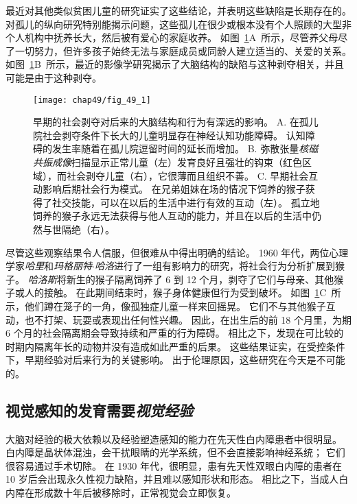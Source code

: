 最近对其他类似贫困儿童的研究证实了这些结论，并表明这些缺陷是长期存在的。
对孤儿的纵向研究特别能揭示问题，这些孤儿在很少或根本没有个人照顾的大型非个人机构中抚养长大，然后被有爱心的家庭收养。
如图~\ref{fig:49_1}A~所示，尽管养父母尽了一切努力，但许多孩子始终无法与家庭成员或同龄人建立适当的、关爱的关系。
如图~\ref{fig:49_1}B~所示，最近的影像学研究揭示了大脑结构的缺陷与这种剥夺相关，并且可能是由于这种剥夺。


\begin{figure}[htbp]
	\centering
	\texttt{[image: chap49/fig\_49\_1]}
	\caption{早期的社会剥夺对后来的大脑结构和行为有深远的影响。
		A. 在孤儿院社会剥夺条件下长大的儿童明显存在神经认知功能障碍。
		认知障碍的发生率随着在孤儿院逗留时间的延长而增加\cite{behen2008incidence}。
		B. 弥散张量\textit{核磁共振成像}扫描显示正常儿童（左）发育良好且强壮的钩束（红色区域），而社会剥夺儿童（右），它很薄而且组织不善\cite{eluvathingal2006abnormal}。
		C. 早期社会互动影响后期社会行为模式。
		在兄弟姐妹在场的情况下饲养的猴子获得了社交技能，可以在以后的生活中进行有效的互动（左）。
		孤立地饲养的猴子永远无法获得与他人互动的能力，并且在以后的生活中仍然与世隔绝（右）。}
	\label{fig:49_1}
\end{figure}


尽管这些观察结果令人信服，但很难从中得出明确的结论。
1960 年代，两位心理学家\textit{哈里}和\textit{玛格丽特$\cdot$哈洛}进行了一组有影响力的研究，将社会行为分析扩展到猴子。
\textit{哈洛斯}将新生的猴子隔离饲养了 6 到 12 个月，剥夺了它们与母亲、其他猴子或人的接触。
在此期间结束时，猴子身体健康但行为受到破坏。
如图~\ref{fig:49_1}C~所示，他们蹲在笼子的一角，像孤独症儿童一样来回摇晃。
它们不与其他猴子互动，也不打架、玩耍或表现出任何性兴趣。
因此，在出生后的前 18 个月里，为期 6 个月的社会隔离期会导致持续和严重的行为障碍。
相比之下，发现在可比较的时期内隔离年长的动物并没有造成如此严重的后果。
这些结果证实，在受控条件下，早期经验对后来行为的关键影响。
出于伦理原因，这些研究在今天是不可能的。



\subsection{视觉感知的发育需要\textit{视觉经验}}

大脑对经验的极大依赖以及经验塑造感知的能力在先天性白内障患者中很明显。
白内障是晶状体混浊，会干扰眼睛的光学系统，但不会直接影响神经系统；
它们很容易通过手术切除。
在 1930 年代，很明显，患有先天性双眼白内障的患者在 10 岁后会出现永久性视力缺陷，并且难以感知形状和形态。
相比之下，当成人白内障在形成数十年后被移除时，正常视觉会立即恢复。


